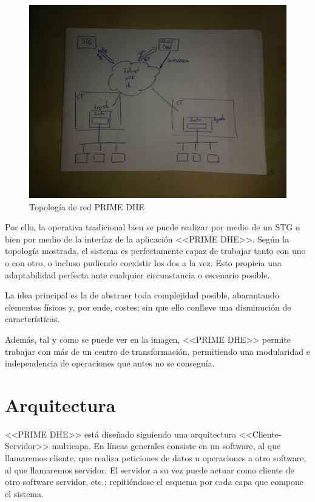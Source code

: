 \begin{figure}[htbp]
	\centering
	\includegraphics[width=\textwidth]{Img/boceto_red_primedhe.jpg}
	\caption{Topología de red PRIME DHE}
	\label{fig:EstructuraPrimeDHE}
\end{figure}

Por ello, la operativa tradicional bien se puede realizar por medio de un STG o bien por medio de la interfaz de la aplicación <<PRIME DHE>>. Según la topología mostrada, el sistema es perfectamente capaz de trabajar tanto con uno o con otro, o incluso pudiendo coexistir los dos a la vez. Esto propicia una adaptabilidad perfecta ante cualquier circunstancia o escenario posible.

La idea principal es la de abstraer toda complejidad posible, abarantando elementos físicos y, por ende, costes; sin que ello conlleve una disminución de características.

 Además, tal y como se puede ver en la imagen, <<PRIME DHE>> permite trabajar con más de un centro de transformación, permitiendo una modularidad e independencia de operaciones que antes no se conseguía. 
 
 \section{Arquitectura}
 
 <<PRIME DHE>> está diseñado siguiendo una arquitectura <<Cliente-Servidor>> multicapa. En líneas generales consiste en un software, al que llamaremos cliente, que realiza peticiones de datos u operaciones a otro software, al que llamaremos servidor. El servidor a su vez puede actuar como cliente de otro software servidor, etc.; repitiéndose el esquema por cada capa que compone el sistema. 
 
